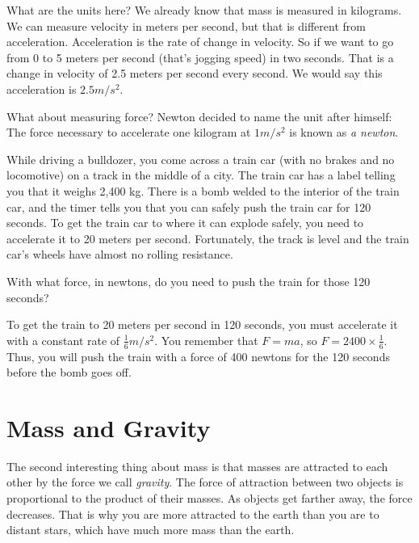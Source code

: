What are the units here? We already know that mass is measured in
kilograms. We can measure velocity in meters per second, but that is
different from acceleration. Acceleration is the rate of change in
velocity. So if we want to go from 0 to 5 meters per second (that's
jogging speed) in two seconds. That is a change in velocity of 2.5
meters per second every second. We would say this acceleration is $2.5
m/s^2$.

What about measuring force? Newton decided to name the unit after
himself: The force necessary to accelerate one kilogram at $1 m/s^2$
is known as \textit{a newton}.

\begin{Exercise}[title={Acceleration}, label=acceleration_train]
  
While driving a bulldozer, you come across a train car (with no brakes
and no locomotive) on a track in the middle of a city. The train car
has a label telling you that it weighs 2,400 kg. There is a bomb
welded to the interior of the train car, and the timer tells you that
you can safely push the train car for 120 seconds. To get the train
car to where it can explode safely, you need to accelerate it to 20 meters per
second. Fortunately, the track is level and the train car's wheels have
almost no rolling resistance.

With what force, in newtons, do you need to push the train for those 120 seconds?

\end{Exercise}
\begin{Answer}[ref=acceleration_train]
To get the train to 20 meters per second in 120 seconds, you must
accelerate it with a constant rate of $\frac{1}{6} m/s^2$. You
remember that $F = m a$, so $F = 2400 \times \frac{1}{6}$. Thus, you
will push the train with a force of 400 newtons for the 120 seconds
before the bomb goes off.
\end{Answer}

\section{Mass and Gravity}

The second interesting thing about mass is that masses are
attracted to each other by the force we call \textit{gravity}. The
force of attraction between two objects is proportional to the product
of their masses. As objects get farther away, the force decreases.
That is why you are more attracted to the earth than you are to
distant stars, which have much more mass than the earth.

